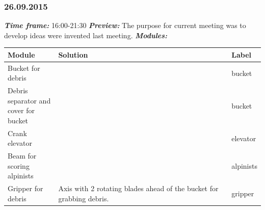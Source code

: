 \subsubsection{26.09.2015}
	\textit{\textbf{Time frame:}} 16:00-21:30 \newline
	\textit{\textbf{Preview:}} The purpose for current meeting was to develop ideas were invented last meeting.\newline \newline
	\textit{\textbf{Modules:}}

  \begin{table}[H]
	\vspace{-2mm}
	\begin{center}
		\begin{tabular}{|p{0.2\linewidth}|p{0.7\linewidth}|p{0.1\linewidth}|}
			\hline
			Module & Solution & Label \\
			\hline
			Bucket for debris &  & bucket \\
			\hline
			Debris separator and cover for bucket &  & bucket \\
			\hline
			Crank elevator &  & elevator \\
			\hline
			Beam for scoring alpinists &  & alpinists \\
			\hline
			Gripper for debris & Axis with 2 rotating blades ahead of the bucket for grabbing debris. & gripper \\
			\hline
		\end{tabular}
	\end{center}
  \end{table}
  
